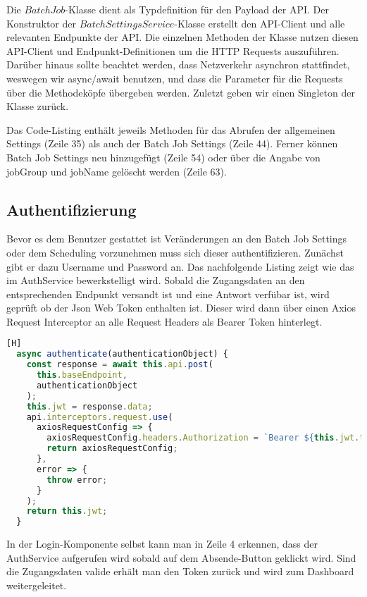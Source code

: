 Die $BatchJob$-Klasse dient als Typdefinition für den Payload der API. Der Konstruktor der $BatchSettingsService$-Klasse erstellt den API-Client und alle relevanten Endpunkte der API. Die einzelnen Methoden der Klasse nutzen diesen API-Client und Endpunkt-Definitionen um die HTTP Requests auszuführen. Darüber hinaus sollte beachtet werden, dass Netzverkehr asynchron stattfindet, weswegen wir async/await benutzen, und dass die Parameter für die Requests über
die Methodeköpfe übergeben werden. Zuletzt geben wir einen Singleton der Klasse zurück.

Das Code-Listing enthält jeweils Methoden für das Abrufen der allgemeinen Settings (Zeile 35) als auch der Batch Job Settings (Zeile 44). Ferner können Batch Job Settings neu hinzugefügt (Zeile 54) oder über die Angabe von jobGroup und jobName gelöscht werden (Zeile 63).

\subsection{Authentifizierung}
Bevor es dem Benutzer gestattet ist Veränderungen an den Batch Job Settings oder dem Scheduling vorzunehmen muss sich dieser authentifizieren. Zunächst gibt er dazu Username und Password an. Das nachfolgende Listing zeigt wie das im AuthService bewerkstelligt wird. Sobald die Zugangsdaten an den entsprechenden Endpunkt versandt ist und eine Antwort verfübar ist, wird geprüft ob der Json Web Token enthalten ist. Dieser wird dann über einen Axios Request Interceptor an alle Request Headers als Bearer Token hinterlegt.

\begin{lstlisting}[language=JavaScript,caption=Ausschnitt aus src/services/AuthService.js][H]
  async authenticate(authenticationObject) {
    const response = await this.api.post(
      this.baseEndpoint,
      authenticationObject
    );
    this.jwt = response.data;
    api.interceptors.request.use(
      axiosRequestConfig => {
        axiosRequestConfig.headers.Authorization = `Bearer ${this.jwt.token}`;
        return axiosRequestConfig;
      },
      error => {
        throw error;
      }
    );
    return this.jwt;
  }
\end{lstlisting}

In der Login-Komponente selbst kann man in Zeile 4 erkennen, dass der AuthService aufgerufen wird sobald auf dem Absende-Button geklickt wird. Sind die Zugangsdaten valide erhält man den Token zurück und wird zum Dashboard weitergeleitet.

